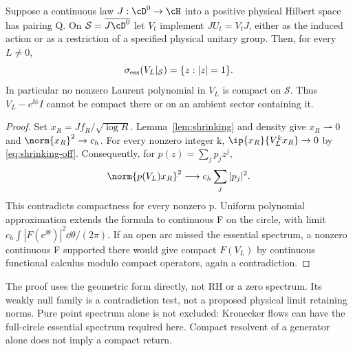 \begin{theorem}\label{thm:compact-return}
Suppose a continuous law $J:\cD^0\to\cH$ into a positive
physical Hilbert space has pairing Q. On
$\mathcal S=\overline{J\cD^0}$ let $V_t$ implement
$JU_t=V_tJ$, either as the induced action or as a restriction
of a specified physical unitary group. Then, for every $L\ne0$,
\begin{equation}\label{eq:essential-circle}
\sigma_{\rm ess}(V_L|_{\mathcal S})=\{z:|z|=1\}.
\end{equation}
In particular no nonzero Laurent polynomial in $V_L$ is
compact on $\mathcal S$. Thus $V_L-e^{\ii\phi}I$ cannot be
compact there or on an ambient sector containing it.
\end{theorem}
\begin{proof}
Set $x_R=Jf_R/\sqrt{\log R}$. Lemma~\ref{lem:shrinking} and
density give $x_R\rightharpoonup0$ and
$\norm{x_R}^2\to c_h$. For every nonzero integer k,
$\ip{x_R}{V_L^kx_R}\to0$ by \eqref{eq:shrinking-off}.
Consequently, for $p(z)=\sum_jp_jz^j$,
\begin{equation}
\norm{p(V_L)x_R}^2\longrightarrow c_h\sum_j|p_j|^2.
\end{equation}
This contradicts compactness for every nonzero p. Uniform
polynomial approximation extends the formula to continuous
F on the circle, with limit
$c_h\int|F(e^{\ii\theta})|^2\dd\theta/(2\pi)$.
If an open arc missed the essential spectrum, a nonzero
continuous F supported there would give compact $F(V_L)$
by continuous functional calculus modulo compact operators,
again a contradiction.
\end{proof}
The proof uses the geometric form directly, not RH or a zero
spectrum. Its weakly null family is a contradiction test,
not a proposed physical limit retaining norms. Pure point
spectrum alone is not excluded: Kronecker flows can have
the full-circle essential spectrum required here. Compact
resolvent of a generator alone does not imply a compact return.

